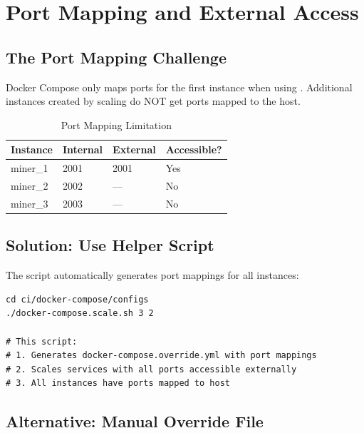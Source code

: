 \section{Port Mapping and External Access}
\label{sec:docker-ports}

\subsection{The Port Mapping Challenge}

Docker Compose only maps ports for the first instance when using . Additional instances created by scaling do NOT get ports mapped to the host.

\begin{table}[htbp]
\caption{Port Mapping Limitation}
\label{tab:port-mapping-issue}
\centering\small
\begin{tabularx}{0.85\textwidth}{llll}
\toprule
\textbf{Instance} & \textbf{Internal} & \textbf{External} & \textbf{Accessible?} \\
\midrule
miner\_1 & 2001 & 2001 & Yes \\
miner\_2 & 2002 & --- & No \\
miner\_3 & 2003 & --- & No \\
\bottomrule
\end{tabularx}
\end{table}

\subsection{Solution: Use Helper Script}

The  script automatically generates port mappings for all instances:

\begin{listing}[htbp]
\caption{Using the Helper Script for Scaling}
\label{lst:ch22-helper-script}
\begin{verbatim}
cd ci/docker-compose/configs
./docker-compose.scale.sh 3 2

# This script:
# 1. Generates docker-compose.override.yml with port mappings
# 2. Scales services with all ports accessible externally
# 3. All instances have ports mapped to host
\end{verbatim}
\end{listing}

\needspace{3in}
\subsection{Alternative: Manual Override File}

